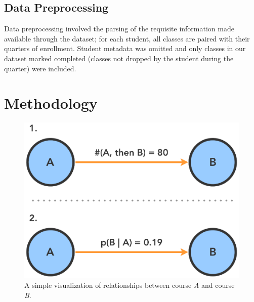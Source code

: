 \documentclass{sigchi}
\begin{document}
\subsection{Data Preprocessing}
\label{sec:data_processing}

Data preprocessing involved the parsing of the requisite information made available through the dataset; for each student, all classes are paired with their quarters of enrollment. Student metadata was omitted and only classes in our dataset marked completed (classes not dropped by the student during the quarter) were included.


\section{Methodology}
\label{sec:methodology}

\begin{figure}
    \centering
    \includegraphics[width=0.75\columnwidth]{final-simple.pdf}
    \caption{A simple visualization of relationships between course \textit{A} and course \textit{B}. }
    \label{fig:simple}
\end{figure}
\end{document}
